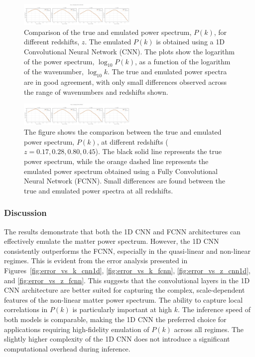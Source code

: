 \documentclass[twocolumn]{aastex631}
\begin{document}
\begin{figure}[h]
    \centering
    \includegraphics[width=0.5\textwidth]{plots/true_vs_emulated_cnn1d_1_1745408311.png}
    \caption{\label{fig:true_vs_emulated_cnn1d}Comparison of the true and emulated power spectrum, $P(k)$, for different redshifts, $z$. The emulated $P(k)$ is obtained using a 1D Convolutional Neural Network (CNN). The plots show the logarithm of the power spectrum, $\log_{10} P(k)$, as a function of the logarithm of the wavenumber, $\log_{10} k$. The true and emulated power spectra are in good agreement, with only small differences observed across the range of wavenumbers and redshifts shown.}
\end{figure}

\begin{figure}[h]
    \centering
    \includegraphics[width=0.5\textwidth]{plots/true_vs_emulated_fcnn_2_1745408315.png}
    \caption{\label{fig:true_vs_emulated_fcnn}The figure shows the comparison between the true and emulated power spectrum, $P(k)$, at different redshifts ($z=0.17, 0.28, 0.80, 0.45$). The black solid line represents the true power spectrum, while the orange dashed line represents the emulated power spectrum obtained using a Fully Convolutional Neural Network (FCNN). Small differences are found between the true and emulated power spectra at all redshifts.}
\end{figure}

\subsubsection{Discussion}

The results demonstrate that both the 1D CNN and FCNN architectures can effectively emulate the matter power spectrum. However, the 1D CNN consistently outperforms the FCNN, especially in the quasi-linear and non-linear regimes. This is evident from the error analysis presented in Figures~\ref{fig:error_vs_k_cnn1d}, \ref{fig:error_vs_k_fcnn}, \ref{fig:error_vs_z_cnn1d}, and \ref{fig:error_vs_z_fcnn}. This suggests that the convolutional layers in the 1D CNN architecture are better suited for capturing the complex, scale-dependent features of the non-linear matter power spectrum. The ability to capture local correlations in $P(k)$ is particularly important at high $k$. The inference speed of both models is comparable, making the 1D CNN the preferred choice for applications requiring high-fidelity emulation of $P(k)$ across all regimes. The slightly higher complexity of the 1D CNN does not introduce a significant computational overhead during inference.
\end{document}
